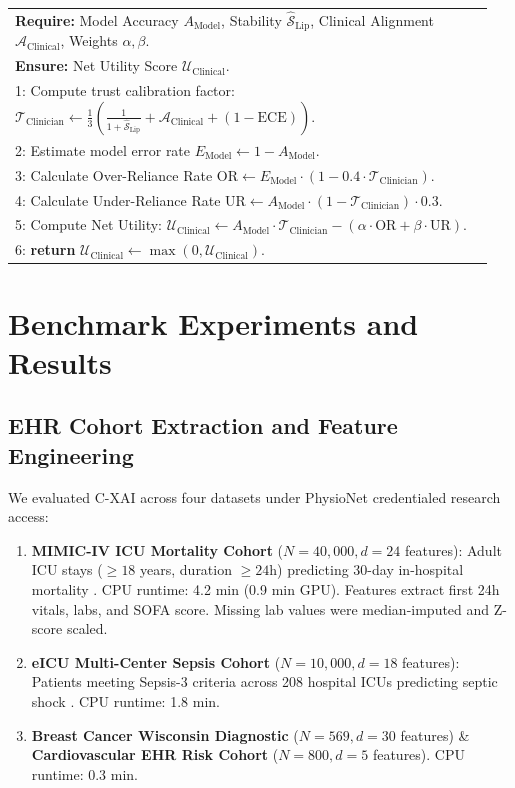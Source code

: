 \documentclass[3p,times,procedia]{elsarticle}
\theoremstyle{definition}
\begin{document}
\begin{table}[htbp]
\begin{tabular}{p{0.95\linewidth}}
\midrule
\textbf{Require:} Model Accuracy $A_{\text{Model}}$, Stability $\widehat{\mathcal{S}}_{\text{Lip}}$, Clinical Alignment $\mathcal{A}_{\text{Clinical}}$, Weights $\alpha, \beta$.\\
\textbf{Ensure:} Net Utility Score $\mathcal{U}_{\text{Clinical}}$.\\
1: Compute trust calibration factor: $\mathcal{T}_{\text{Clinician}} \leftarrow \frac{1}{3} \left( \frac{1}{1 + \widehat{\mathcal{S}}_{\text{Lip}}} + \mathcal{A}_{\text{Clinical}} + (1 - \text{ECE}) \right)$.\\
2: Estimate model error rate $E_{\text{Model}} \leftarrow 1 - A_{\text{Model}}$.\\
3: Calculate Over-Reliance Rate $\text{OR} \leftarrow E_{\text{Model}} \cdot (1 - 0.4 \cdot \mathcal{T}_{\text{Clinician}})$.\\
4: Calculate Under-Reliance Rate $\text{UR} \leftarrow A_{\text{Model}} \cdot (1 - \mathcal{T}_{\text{Clinician}}) \cdot 0.3$.\\
5: Compute Net Utility: $\mathcal{U}_{\text{Clinical}} \leftarrow A_{\text{Model}} \cdot \mathcal{T}_{\text{Clinician}} - (\alpha \cdot \text{OR} + \beta \cdot \text{UR})$.\\
6: \textbf{return} $\mathcal{U}_{\text{Clinical}} \leftarrow \max(0, \mathcal{U}_{\text{Clinical}})$.\\
\bottomrule
\end{tabular}
\end{table}

\section{Benchmark Experiments and Results}

\subsection{EHR Cohort Extraction and Feature Engineering}
We evaluated C-XAI across four datasets under PhysioNet credentialed research access:
\begin{enumerate}\setlength{\itemsep}{0pt}\setlength{\parsep}{0pt}\setlength{\parskip}{0pt}
    \item \textbf{MIMIC-IV ICU Mortality Cohort} ($N = 40,000, d = 24$ features): Adult ICU stays ($\ge 18$ years, duration $\ge 24$h) predicting 30-day in-hospital mortality \cite{johnson2023mimic}. CPU runtime: 4.2 min (0.9 min GPU). Features extract first 24h vitals, labs, and SOFA score. Missing lab values were median-imputed and Z-score scaled.
    \item \textbf{eICU Multi-Center Sepsis Cohort} ($N = 10,000, d = 18$ features): Patients meeting Sepsis-3 criteria across 208 hospital ICUs predicting septic shock \cite{pollard2018eicu}. CPU runtime: 1.8 min.
    \item \textbf{Breast Cancer Wisconsin Diagnostic} ($N = 569, d = 30$ features) \& \textbf{Cardiovascular EHR Risk Cohort} ($N = 800, d = 5$ features). CPU runtime: 0.3 min.
\end{enumerate}
\end{document}
